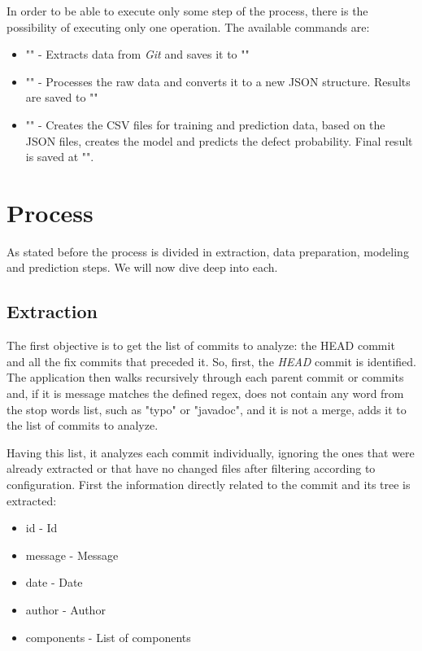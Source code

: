 In order to be able to execute only some step of the process, there is the possibility of executing only one operation. The available commands are:
%
\begin{itemize}
\item "" - Extracts data from \emph{Git} and saves it to ""
\item "" - Processes the raw data and converts it to a new JSON structure. Results are saved to ""
\item "" - Creates the CSV files for training and prediction data, based on the JSON files, creates the model and predicts the defect probability.
Final result is saved at "".
\end{itemize}

\section{Process}

As stated before the process is divided in extraction, data preparation, modeling and prediction steps. We will now dive deep into each.

\subsection{Extraction}

The first objective is to get the list of commits to analyze: the HEAD commit and all the fix commits that preceded it. 
So, first, the \emph{HEAD} commit is identified. The application then walks recursively through each parent commit or commits and,
if it is message matches the defined regex, does not contain any word from the stop words list, such as "typo" or "javadoc", and it is not a merge, adds it to the list of commits to analyze.


Having this list, it analyzes each commit individually, ignoring the ones that were already extracted or that have no changed files after filtering
according to configuration.
First the information directly related to the commit and its tree is extracted:
%
\begin{itemize}
\item id - Id
\item message - Message
\item date - Date
\item author - Author
\item components - List of components
\end{itemize}

